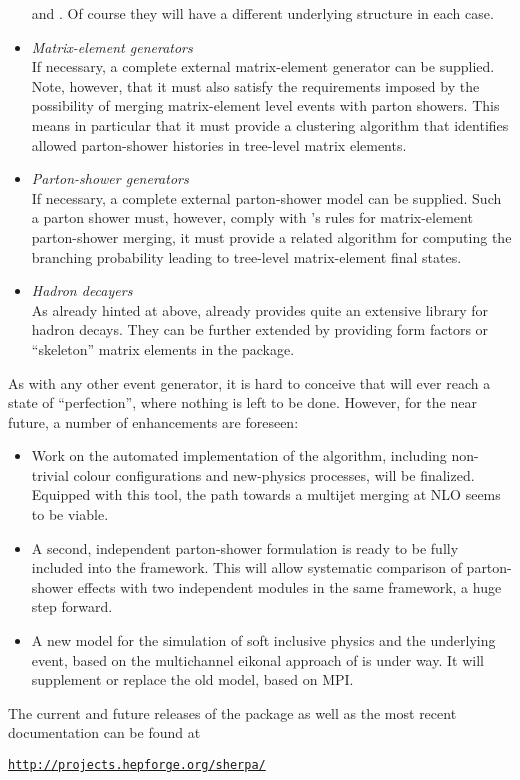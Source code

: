 \begin{itemize}
\Amegic and \Comix. Of course they will have a different underlying 
structure in each case.
\item {\em Matrix-element generators}\\
If necessary, a complete external matrix-element generator can be supplied.
Note, however, that it must also satisfy the requirements imposed by the
possibility of merging matrix-element level events with parton showers.
This means in particular that it must provide a clustering algorithm
that identifies allowed parton-shower histories in tree-level matrix 
elements.
\item {\em Parton-shower generators}\\
If necessary, a complete external parton-shower model can be supplied.
Such a parton shower must, however, comply with \Sherpa's rules for 
matrix-element parton-shower merging, \ie it must provide a related
algorithm for computing the branching probability leading to tree-level 
matrix-element final states.
\item {\em Hadron decayers}\\
As already hinted at above, \Sherpa already provides quite an extensive
library for hadron decays.  They can be further extended by providing
form factors or ``skeleton'' matrix elements in the \Hadrons package.
\end{itemize}

\mcsubsection{\gensectionoutlook}
As with any other event generator, it is hard to conceive that \Sherpa will 
ever reach a state of ``perfection'', where nothing is left to be done.  
However, for the near future, a number of enhancements are foreseen:
\begin{itemize}
\item Work on the automated implementation of the 
  \POWHEG algorithm, including non-trivial colour configurations and 
  new-physics processes, will be finalized.  Equipped with this tool, the path towards a 
  multijet merging at NLO seems to be viable.  
\item A second, independent parton-shower formulation is ready to be fully
  included into the framework.  This will allow systematic comparison of
  parton-shower effects with two independent modules in the same framework,
  a huge step forward.
\item A new model for the simulation of soft inclusive physics and the
  underlying event, based on the multichannel eikonal approach of
  \cite{Ryskin:2009tj} is under way.  It will supplement or replace the
  old model, based on MPI.  
\end{itemize}

The current and future releases of the \Sherpa package as well as the most recent documentation can be found at
\begin{center} 
\href{http://projects.hepforge.org/sherpa/}{\tt http://projects.hepforge.org/sherpa/}
\end{center}

